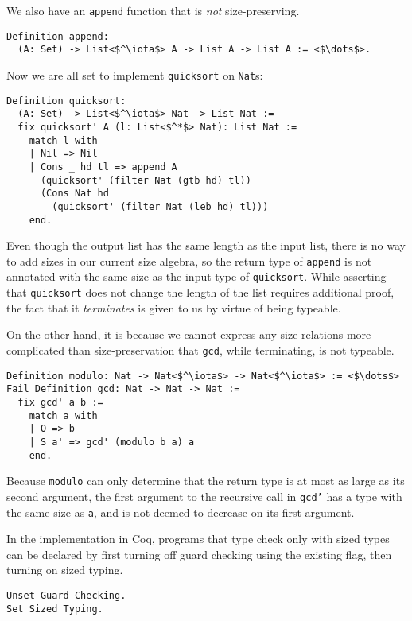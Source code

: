 We also have an \texttt{append} function that is \textit{not} size-preserving.
\begin{verbatim}
Definition append:
  (A: Set) -> List<$^\iota$> A -> List A -> List A := <$\dots$>.
\end{verbatim}

Now we are all set to implement \texttt{quicksort} on \texttt{Nat}s:
\begin{verbatim}
Definition quicksort:
  (A: Set) -> List<$^\iota$> Nat -> List Nat :=
  fix quicksort' A (l: List<$^*$> Nat): List Nat :=
    match l with
    | Nil => Nil
    | Cons _ hd tl => append A
      (quicksort' (filter Nat (gtb hd) tl))
      (Cons Nat hd
        (quicksort' (filter Nat (leb hd) tl)))
    end.
\end{verbatim}
Even though the output list has the same length as the input list, there is no way to add sizes in our current size algebra, so the return type of \texttt{append} is not annotated with the same size as the input type of \texttt{quicksort}. While asserting that \texttt{quicksort} does not change the length of the list requires additional proof, the fact that it \textit{terminates} is given to us by virtue of being typeable.

On the other hand, it is because we cannot express any size relations more complicated than size-preservation that \texttt{gcd}, while terminating, is not typeable.

\begin{verbatim}
Definition modulo: Nat -> Nat<$^\iota$> -> Nat<$^\iota$> := <$\dots$>
Fail Definition gcd: Nat -> Nat -> Nat :=
  fix gcd' a b :=
    match a with
    | O => b
    | S a' => gcd' (modulo b a) a
    end.
\end{verbatim}

Because \texttt{modulo} can only determine that the return type is at most as large as its second argument, the first argument to the recursive call in \texttt{gcd'} has a type with the same size as \texttt{a}, and is not deemed to decrease on its first argument.

In the implementation in Coq, programs that type check only with sized types can be declared by first turning off guard checking using the existing flag, then turning on sized typing.

\begin{verbatim}
Unset Guard Checking.
Set Sized Typing.
\end{verbatim}


